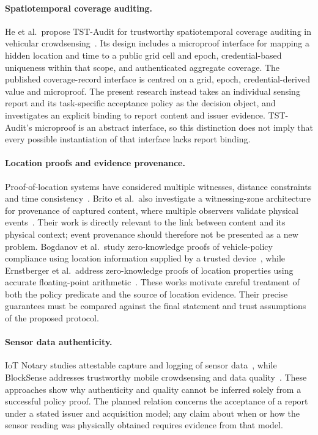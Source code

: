 \paragraph{Spatiotemporal coverage auditing.}
He et al.\ propose TST-Audit for trustworthy spatiotemporal coverage auditing in vehicular crowdsensing~\cite{He2026TSTAudit}. Its design includes a microproof interface for mapping a hidden location and time to a public grid cell and epoch, credential-based uniqueness within that scope, and authenticated aggregate coverage. The published coverage-record interface is centred on a grid, epoch, credential-derived value and microproof. The present research instead takes an individual sensing report and its task-specific acceptance policy as the decision object, and investigates an explicit binding to report content and issuer evidence. TST-Audit's microproof is an abstract interface, so this distinction does not imply that every possible instantiation of that interface lacks report binding.

\paragraph{Location proofs and evidence provenance.}
Proof-of-location systems have considered multiple witnesses, distance constraints and time consistency~\cite{Brito2025DecentralizedPoL}. Brito et al.\ also investigate a witnessing-zone architecture for provenance of captured content, where multiple observers validate physical events~\cite{Brito2026ContentProvenance}. Their work is directly relevant to the link between content and its physical context; event provenance should therefore not be presented as a new problem. Bogdanov et al.\ study zero-knowledge proofs of vehicle-policy compliance using location information supplied by a trusted device~\cite{Bogdanov2025VehiclePolicy}, while Ernstberger et al.\ address zero-knowledge proofs of location properties using accurate floating-point arithmetic~\cite{Ernstberger2025ZKLP}. These works motivate careful treatment of both the policy predicate and the source of location evidence. Their precise guarantees must be compared against the final statement and trust assumptions of the proposed protocol.

\paragraph{Sensor data authenticity.}
IoT Notary studies attestable capture and logging of sensor data~\cite{Panwar2022IoTNotary}, while BlockSense addresses trustworthy mobile crowdsensing and data quality~\cite{Huang2024BlockSense}. These approaches show why authenticity and quality cannot be inferred solely from a successful policy proof. The planned relation concerns the acceptance of a report under a stated issuer and acquisition model; any claim about when or how the sensor reading was physically obtained requires evidence from that model.

